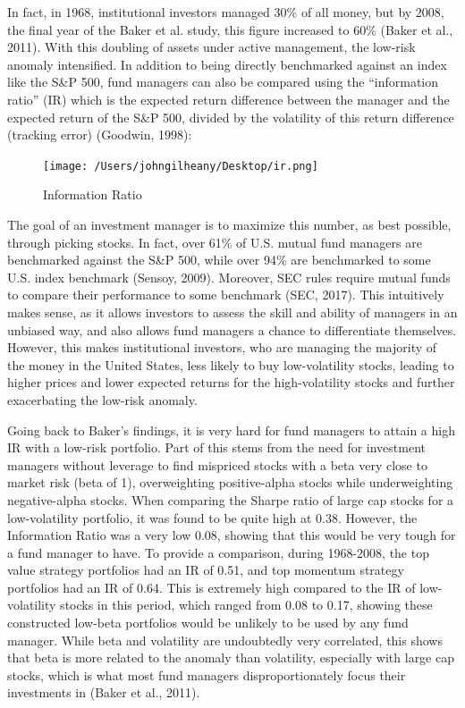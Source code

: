 \documentclass[12pt,twoside]{reedthesis}
\theoremstyle{definition}
\theoremstyle{definition}
\theoremstyle{definition}
\theoremstyle{remark}
\begin{document}
In fact, in 1968, institutional investors managed 30\% of all money, but
by 2008, the final year of the Baker et al. study, this figure increased
to 60\% (Baker et al., 2011). With this doubling of assets under active
management, the low-risk anomaly intensified. In addition to being
directly benchmarked against an index like the S\&P 500, fund managers
can also be compared using the ``information ratio'' (IR) which is the
expected return difference between the manager and the expected return
of the S\&P 500, divided by the volatility of this return difference
(tracking error) (Goodwin, 1998):
\begin{figure}
\centerline{\texttt{[image: /Users/johngilheany/Desktop/ir.png]}}
\caption{Information Ratio}
\label{IR}
\end{figure}
The goal of an investment manager is to maximize this number, as best
possible, through picking stocks. In fact, over 61\% of U.S. mutual fund
managers are benchmarked against the S\&P 500, while over 94\% are
benchmarked to some U.S. index benchmark (Sensoy, 2009). Moreover, SEC
rules require mutual funds to compare their performance to some
benchmark (SEC, 2017). This intuitively makes sense, as it allows
investors to assess the skill and ability of managers in an unbiased
way, and also allows fund managers a chance to differentiate themselves.
However, this makes institutional investors, who are managing the
majority of the money in the United States, less likely to buy
low-volatility stocks, leading to higher prices and lower expected
returns for the high-volatility stocks and further exacerbating the
low-risk anomaly.

Going back to Baker's findings, it is very hard for fund managers to
attain a high IR with a low-risk portfolio. Part of this stems from the
need for investment managers without leverage to find mispriced stocks
with a beta very close to market risk (beta of 1), overweighting
positive-alpha stocks while underweighting negative-alpha stocks. When
comparing the Sharpe ratio of large cap stocks for a low-volatility
portfolio, it was found to be quite high at 0.38. However, the
Information Ratio was a very low 0.08, showing that this would be very
tough for a fund manager to have. To provide a comparison, during
1968-2008, the top value strategy portfolios had an IR of 0.51, and top
momentum strategy portfolios had an IR of 0.64. This is extremely high
compared to the IR of low-volatility stocks in this period, which ranged
from 0.08 to 0.17, showing these constructed low-beta portfolios would
be unlikely to be used by any fund manager. While beta and volatility
are undoubtedly very correlated, this shows that beta is more related to
the anomaly than volatility, especially with large cap stocks, which is
what most fund managers disproportionately focus their investments in
(Baker et al., 2011).
\end{document}
